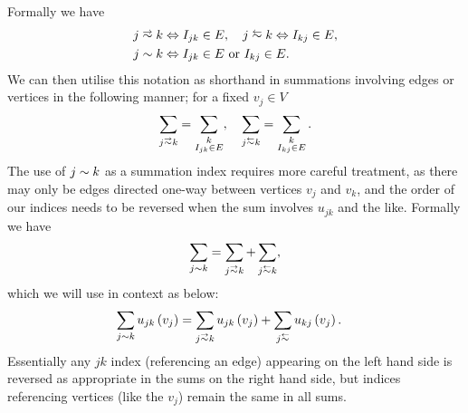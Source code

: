 Formally we have
\begin{align*}
	j\conLeft k &\Leftrightarrow I_{jk}\in E, \quad
	j\conRight k \Leftrightarrow I_{kj}\in E, \\
	j\con k &\Leftrightarrow I_{jk}\in E \text{ or } I_{kj}\in E.
\end{align*}
We can then utilise this notation as shorthand in summations involving edges or vertices in the following manner; for a fixed $v_j\in V$
\begin{align*}
	\sum_{j\conLeft k} = \sum_{\substack{k \\ I_{jk}\in E}}, \quad
	\sum_{j\conRight k} = \sum_{\substack{k \\ I_{kj}\in E}}.
\end{align*}
The use of $j\sim k$ as a summation index requires more careful treatment, as there may only be edges directed one-way between vertices $v_j$ and $v_k$, and the order of our indices needs to be reversed when the sum involves $u_{jk}$ and the like.
Formally we have
\begin{align*}
	\sum_{j\con k} = \sum_{j\conLeft k} + \sum_{j\conRight k},
\end{align*}
which we will use in context as below:
\begin{align*}
	\sum_{j\con k}u_{jk}\bracs{v_j} &= \sum_{j\conLeft k}u_{jk}\bracs{v_j} + \sum_{j\conRight }u_{kj}\bracs{v_j}.
\end{align*}
Essentially any $jk$ index (referencing an edge) appearing on the left hand side is reversed as appropriate in the sums on the right hand side, but indices referencing vertices (like the $v_j$) remain the same in all sums. \newline

